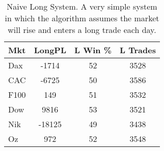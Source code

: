 \begin{table}[ht]
\centering
\caption[Naive Long System]{Naive Long System. A very simple system in which the algorithm assumes the market will rise and enters a long trade each day.} 
\label{tab:nlng_results}
\begin{tabular}{lccc}
  \toprule Mkt & LongPL & L Win \% & L Trades \\ 
  \midrule Dax & -1714 & 52 & 3528 \\ 
  CAC & -6725 & 50 & 3586 \\ 
  F100 & 149 & 51 & 3532 \\ 
  Dow & 9816 & 53 & 3521 \\ 
  Nik & -18125 & 49 & 3438 \\ 
  Oz & 972 & 52 & 3548 \\ 
   \bottomrule \end{tabular}
\end{table}
